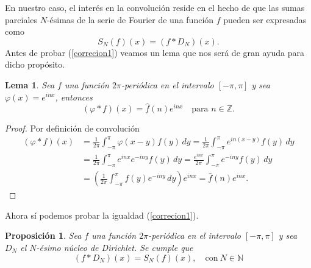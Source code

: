 \documentclass[12pt]{article}
\newcommand{\N}{\mathbb{N}}
\theoremstyle{plain}
\newtheorem{proposicion}[teorema]{Proposición}
\newtheorem{lema}[teorema]{Lema}
\theoremstyle{definition}
\numberwithin{equation}{section}
\begin{document}
        En nuestro caso, el interés en la convolución reside en el hecho de que las sumas parciales \(N\)-ésimas de la serie de Fourier de una función \(f\) pueden ser expresadas como
        \begin{equation}
            \label{correcion1}
            S_N(f)(x) = (f \ast D_N)(x).
        \end{equation}
        Antes de probar (\ref{correcion1}) veamos un lema que nos será de gran ayuda para dicho propósito.
        \begin{lema}
            \label{kat}
            Sea \(f\) una función \(2\pi\)-periódica en el intervalo \([-\pi,\pi]\) y sea \(\varphi(x) = e^{inx}\), entonces
            $$(\varphi \ast f)(x) = \hat{f}(n)e^{inx} \quad \text{para \(n \in \mathbb{Z}\)}.$$
        \end{lema}
        \begin{proof}
            Por definición de convolución
            \begin{align*}
                (\varphi \ast f)(x) &= \frac{1}{2\pi} \int_{-\pi}^{\pi} \varphi(x-y)f(y) \,dy = \frac{1}{2\pi} \int_{-\pi}^{\pi} e^{in(x-y)}f(y) \,dy\\
                &= \frac{1}{2\pi} \int_{-\pi}^{\pi} e^{inx}e^{-iny}f(y) \,dy = \frac{e^{inx}}{2\pi} \int_{-\pi}^{\pi} e^{-iny}f(y) \,dy\\
                &= \left(\frac{1}{2\pi} \int_{-\pi}^{\pi} f(y)e^{-iny} \,dy\right) e^{inx} = \hat{f}(n)e^{inx}.
            \end{align*}
        \end{proof}
        Ahora sí podemos probar la igualdad (\ref{correcion1}).
        \begin{proposicion}
            Sea \(f\) una función \(2\pi\)-periódica en el intervalo \([-\pi,\pi]\) y sea \(D_N\) el \(N\)-ésimo núcleo de Dirichlet. Se cumple que
            $$(f \ast D_N)(x) = S_N(f)(x), \quad \text{con}\ N \in \N$$
        \end{proposicion}
\end{document}

